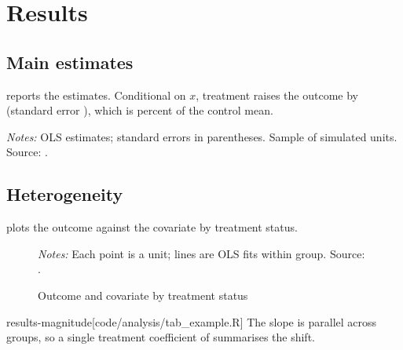 \section{Results}\label{sec:results}

\subsection{Main estimates}\label{sec:results-main}

 reports the estimates. Conditional on $x$, treatment raises the
outcome by  (standard error ), which is
 percent of the control mean.

\begin{table}[htbp]
\centering
\begin{threeparttable}
\caption{Effect of treatment on the outcome}\label{tab:main}
\begin{tablenotes}\small
\item \textit{Notes:} OLS estimates; standard errors in parentheses. Sample of
 simulated units. Source: .
\end{tablenotes}
\end{threeparttable}
\end{table}

\subsection{Heterogeneity}\label{sec:results-heterogeneity}

 plots the outcome against the covariate by treatment status.

\begin{figure}[htbp]
\centering
{}
\caption{Outcome and covariate by treatment status}\label{fig:main}
\begin{minipage}{0.9\textwidth}\footnotesize
\textit{Notes:} Each point is a unit; lines are OLS fits within group.
Source: .
\end{minipage}
\end{figure}

\begin{passage}{results-magnitude}[code/analysis/tab_example.R]
The slope is parallel across groups, so a single treatment coefficient of
 summarises the shift.
\end{passage}
